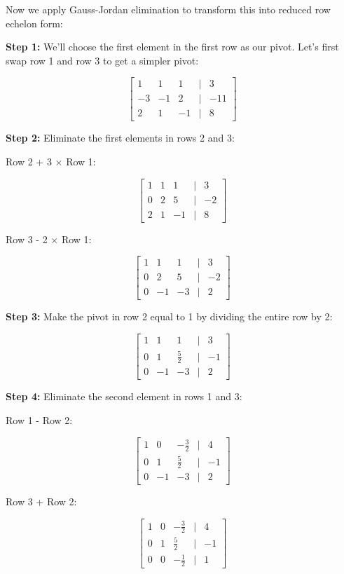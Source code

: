 Now we apply Gauss-Jordan elimination to transform this into reduced row echelon form:

\textbf{Step 1:} We'll choose the first element in the first row as our pivot. Let's first swap row 1 and row 3 to get a simpler pivot:

\[
    \begin{bmatrix}
    1 & 1 & 1 & | & 3 \\
    -3 & -1 & 2 & | & -11 \\
    2 & 1 & -1 & | & 8
    \end{bmatrix}
\]

\textbf{Step 2:} Eliminate the first elements in rows 2 and 3:

Row 2 + 3 \(\times\) Row 1:

\[
    \begin{bmatrix}
    1 & 1 & 1 & | & 3 \\
    0 & 2 & 5 & | & -2 \\
    2 & 1 & -1 & | & 8
    \end{bmatrix}
\]

Row 3 - 2 \(\times\) Row 1:

\[
    \begin{bmatrix}
    1 & 1 & 1 & | & 3 \\
    0 & 2 & 5 & | & -2 \\
    0 & -1 & -3 & | & 2
    \end{bmatrix}
\]

\textbf{Step 3:} Make the pivot in row 2 equal to 1 by dividing the entire row by 2:

\[
    \begin{bmatrix}
    1 & 1 & 1 & | & 3 \\
    0 & 1 & \frac{5}{2} & | & -1 \\
    0 & -1 & -3 & | & 2
    \end{bmatrix}
\]

\textbf{Step 4:} Eliminate the second element in rows 1 and 3:

Row 1 - Row 2:

\[
    \begin{bmatrix}
    1 & 0 & -\frac{3}{2} & | & 4 \\
    0 & 1 & \frac{5}{2} & | & -1 \\
    0 & -1 & -3 & | & 2
    \end{bmatrix}
\]

Row 3 + Row 2:

\[
    \begin{bmatrix}
    1 & 0 & -\frac{3}{2} & | & 4 \\
    0 & 1 & \frac{5}{2} & | & -1 \\
    0 & 0 & -\frac{1}{2} & | & 1
    \end{bmatrix}
\]

